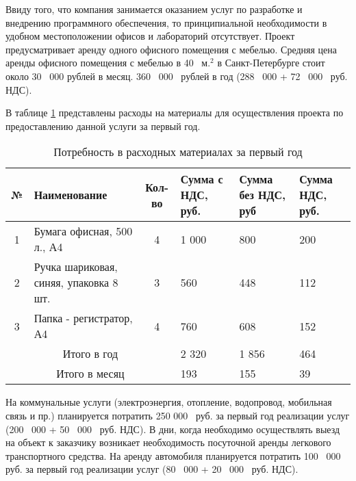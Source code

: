 Ввиду того, что компания занимается оказанием услуг по разработке и внедрению программного обеспечения, то принципиальной необходимости в удобном местоположении офисов и лабораторий отсутствует.  Проект предусматривает аренду одного офисного помещения с мебелью. Средняя цена аренды офисного помещения с мебелью в 40~ м.$^{2}$ в Санкт-Петербурге стоит около 30~ 000 рублей в месяц. 360~ 000~ рублей в год (288~ 000 + 72~ 000~ руб. НДС).

В таблице \ref{tab:plan_mat} представлены расходы на материалы для осуществления проекта по предоставлению данной услуги за первый год.

\begin{table}[h!]
	\small
	\caption{Потребность в расходных материалах за первый год}
	\label{tab:plan_mat}
	\centering
	\begin{tabular}{|c|p{3.8cm}|c|p{2.5cm}|p{2.5cm}|p{2.5cm}|}
		\hline
		№ & Наименование & Кол-во & Сумма с НДС, руб. & Сумма без НДС, руб & Сумма НДС, руб. \\
		\hline
		1 & Бумага офисная, 500 л., А4  & 4 & 1 000 & 800 & 200\\
		\hline
		2 & Ручка шариковая, синяя, упаковка 8 шт. & 3 & 560 & 448 & 112\\
		\hline
		3 & Папка - регистратор, А4 & 4 & 760 & 608 &152\\
		\hline
		\multicolumn{3}{|c|}{Итого в год} & 2 320 & 1 856 & 464 \\
		\hline
		\multicolumn{3}{|c|}{Итого в месяц} & 193 & 155 & 39 \\
		\hline
	\end{tabular}
\end{table}


На коммунальные услуги (электроэнергия, отопление, водопровод, мобильная связь и пр.) планируется потратить 250 000~ руб. за первый год реализации услуг (200~ 000 + 50~ 000~ руб. НДС). В дни, когда необходимо осуществлять выезд на объект к заказчику возникает необходимость посуточной аренды легкового транспортного средства. На аренду автомобиля планируется потратить 100~ 000~ руб. за первый год реализации услуг (80~ 000 + 20~ 000~ руб. НДС).

